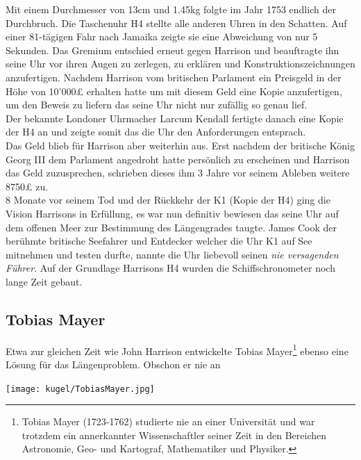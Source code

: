 \begin{refsection}
\begin{refsection}
Mit einem Durchmesser von 13cm und 1.45kg folgte im Jahr 1753 endlich der Durchbruch.
Die Taschenuhr H4 stellte alle anderen Uhren in den Schatten. Auf einer 81-tägigen Fahr nach Jamaika zeigte sie eine Abweichung von nur 5 Sekunden.
Das Gremium entschied erneut gegen Harrison und beauftragte ihn seine Uhr vor ihren Augen zu zerlegen, zu erklären und Konstruktionszeichnungen anzufertigen.
Nachdem Harrison vom britischen Parlament ein Preisgeld in der Höhe von 10’000£ erhalten hatte um mit diesem Geld eine Kopie anzufertigen, um den Beweis zu liefern das seine Uhr nicht nur zufällig so genau lief.\\
Der bekannte Londoner Uhrmacher Larcum Kendall fertigte danach eine Kopie der H4 an und zeigte somit das die Uhr den Anforderungen entsprach.\\
Das Geld blieb für Harrison aber weiterhin aus. Erst nachdem der britische König Georg III dem Parlament angedroht hatte persönlich zu erscheinen und Harrison das Geld zuzusprechen, schrieben dieses ihm 3 Jahre vor seinem Ableben weitere 8750£ zu.\\
8 Monate vor seinem Tod und der Rückkehr der K1 (Kopie der H4) ging die Vision Harrisons in Erfüllung, es war nun definitiv bewiesen das seine Uhr auf dem offenen Meer zur Bestimmung des Längengrades taugte. James Cook der berühmte britische Seefahrer und Entdecker welcher die Uhr K1 auf See mitnehmen und testen durfte, nannte die Uhr liebevoll seinen \textit{nie versagenden Führer}.
Auf der Grundlage Harrisons H4 wurden die Schiffschronometer noch lange Zeit gebaut.



\subsection{Tobias Mayer}
Etwa zur gleichen Zeit wie John Harrison entwickelte Tobias Mayer\footnote{%
Tobias Mayer (1723-1762) studierte nie an einer Universität und war trotzdem ein annerkannter Wissenschaftler seiner Zeit in den Bereichen Astronomie, Geo- und Kartograf, Mathematiker und Physiker.}  ebenso eine Lösung für das Längenproblem. Obschon er nie an 


\begin{center}
        \texttt{[image: kugel/TobiasMayer.jpg]}
\end{center}


\end{refsection}
\end{refsection}
